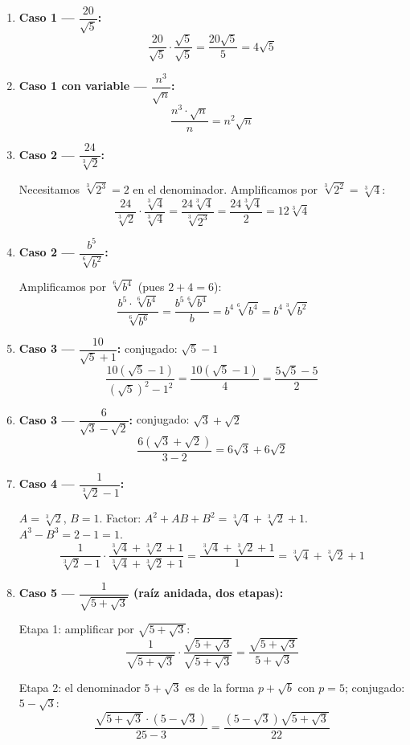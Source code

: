 \documentclass[11pt, letterpaper]{article}
\begin{document}
\begin{tcolorbox}[examplebox, title={Ejemplo guiado — un ejemplo completo de cada caso}]
\begin{enumerate}[label=\textbf{Ej. \arabic*.}, leftmargin=*]

\item \textbf{Caso 1 — $\dfrac{20}{\sqrt{5}}$:}
$$\frac{20}{\sqrt{5}}\cdot\frac{\sqrt{5}}{\sqrt{5}}=\frac{20\sqrt{5}}{5}=4\sqrt{5}$$

\item \textbf{Caso 1 con variable — $\dfrac{n^3}{\sqrt{n}}$:}
$$\frac{n^3\cdot\sqrt{n}}{n}=n^2\sqrt{n}$$

\item \textbf{Caso 2 — $\dfrac{24}{\sqrt[3]{2}}$:}

Necesitamos $\sqrt[3]{2^3}=2$ en el denominador. Amplificamos por $\sqrt[3]{2^2}=\sqrt[3]{4}$:
$$\frac{24}{\sqrt[3]{2}}\cdot\frac{\sqrt[3]{4}}{\sqrt[3]{4}}=\frac{24\sqrt[3]{4}}{\sqrt[3]{2^3}}=\frac{24\sqrt[3]{4}}{2}=12\sqrt[3]{4}$$

\item \textbf{Caso 2 — $\dfrac{b^5}{\sqrt[6]{b^2}}$:}

Amplificamos por $\sqrt[6]{b^4}$ (pues $2+4=6$):
$$\frac{b^5\cdot\sqrt[6]{b^4}}{\sqrt[6]{b^6}}=\frac{b^5\sqrt[6]{b^4}}{b}=b^4\sqrt[6]{b^4}=b^4\sqrt[3]{b^2}$$

\item \textbf{Caso 3 — $\dfrac{10}{\sqrt{5}+1}$:} \quad conjugado: $\sqrt{5}-1$
$$\frac{10(\sqrt{5}-1)}{(\sqrt{5})^2-1^2}=\frac{10(\sqrt{5}-1)}{4}=\frac{5\sqrt{5}-5}{2}$$

\item \textbf{Caso 3 — $\dfrac{6}{\sqrt{3}-\sqrt{2}}$:} \quad conjugado: $\sqrt{3}+\sqrt{2}$
$$\frac{6(\sqrt{3}+\sqrt{2})}{3-2}=6\sqrt{3}+6\sqrt{2}$$

\item \textbf{Caso 4 — $\dfrac{1}{\sqrt[3]{2}-1}$:}

$A=\sqrt[3]{2}$, $B=1$. Factor: $A^2+AB+B^2=\sqrt[3]{4}+\sqrt[3]{2}+1$. $A^3-B^3=2-1=1$.
$$\frac{1}{\sqrt[3]{2}-1}\cdot\frac{\sqrt[3]{4}+\sqrt[3]{2}+1}{\sqrt[3]{4}+\sqrt[3]{2}+1}=\frac{\sqrt[3]{4}+\sqrt[3]{2}+1}{1}=\sqrt[3]{4}+\sqrt[3]{2}+1$$

\item \textbf{Caso 5 — $\dfrac{1}{\sqrt{5+\sqrt{3}}}$ (raíz anidada, dos etapas):}

Etapa 1: amplificar por $\sqrt{5+\sqrt{3}}$:
$$\frac{1}{\sqrt{5+\sqrt{3}}}\cdot\frac{\sqrt{5+\sqrt{3}}}{\sqrt{5+\sqrt{3}}}=\frac{\sqrt{5+\sqrt{3}}}{5+\sqrt{3}}$$

Etapa 2: el denominador $5+\sqrt{3}$ es de la forma $p+\sqrt{b}$ con $p=5$; conjugado: $5-\sqrt{3}$:
$$\frac{\sqrt{5+\sqrt{3}}\cdot(5-\sqrt{3})}{25-3}=\frac{(5-\sqrt{3})\sqrt{5+\sqrt{3}}}{22}$$

\end{enumerate}
\end{tcolorbox}
\end{document}
